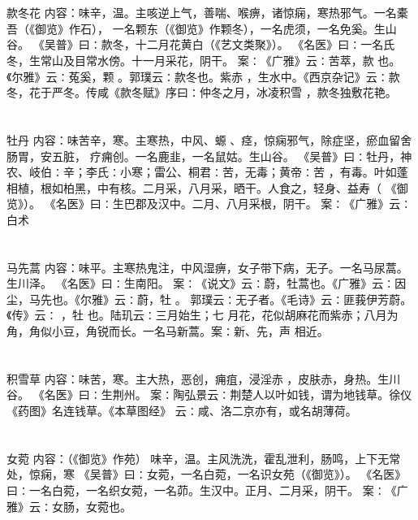\documentclass[12pt,UTF8]{ctexbook}
\begin{document}
\section{}款冬花
内容：味辛，温。主咳逆上气，善喘、喉痹，诸惊痫，寒热邪气。一名橐吾（《御览》作石）， 
一名颗东（《御览》作颗冬），一名虎须，一名免奚。生山谷。 
《吴普》曰∶款冬，十二月花黄白（《艺文类聚》）。 
《名医》曰∶一名氏冬，生常山及目常水傍。十一月采花，阴干。 
案∶《广雅》云∶苦萃，款 也。《尔雅》云∶菟奚，颗 。郭璞云∶款冬也。紫赤 
，生水中。《西京杂记》云∶款冬，花于严冬。传咸《款冬赋》序曰∶仲冬之月，冰凌积雪 
，款冬独敷花艳。 


\section{}牡丹
内容：味苦辛，寒。主寒热，中风、螈 、痉，惊痫邪气，除症坚，瘀血留舍肠胃，安五脏， 
疗痈创。一名鹿韭，一名鼠姑。生山谷。 
《吴普》曰∶牡丹，神农、岐伯∶辛；李氏∶小寒；雷公、桐君∶苦，无毒；黄帝∶苦 
，有毒。叶如蓬相植，根如柏黑，中有核。二月采，八月采，晒干。人食之，轻身、益寿（ 
《御览》）。 
《名医》曰∶生巴郡及汉中。二月、八月采根，阴干。 
案∶《广雅》云∶白术 


\section{}马先蒿
内容：味平。主寒热鬼注，中风湿痹，女子带下病，无子。一名马尿蒿。生川泽。 
《名医》曰∶生南阳。 
案∶《说文》云∶蔚，牡蒿也。《广雅》云∶因尘，马先也。《尔雅》云∶蔚，牡 。 
郭璞云∶无子者。《毛诗》云∶匪莪伊芳蔚。《传》云∶ ，牡 也。陆玑云∶三月始生；七 
月花，花似胡麻花而紫赤；八月为角，角似小豆，角锐而长。一名马新蒿。案∶新、先，声 
相近。 


\section{}积雪草
内容：味苦，寒。主大热，恶创，痈疽，浸淫赤 ，皮肤赤，身热。生川谷。 
《名医》曰∶生荆州。 
案∶陶弘景云∶荆楚人以叶如钱，谓为地钱草。徐仪《药图》名连钱草。《本草图经》 
云∶咸、洛二京亦有，或名胡薄荷。 


\section{}女菀
内容：（《御览》作苑） 
味辛，温。主风洗洗，霍乱泄利，肠鸣，上下无常处，惊痫，寒 
《吴普》曰∶女菀，一名白菀，一名识女苑（《御览》）。 
《名医》曰∶一名白菀，一名织女菀，一名茆。生汉中。正月、二月采，阴干。 
案∶《广雅》云∶女肠，女菀也。 
\end{document}
